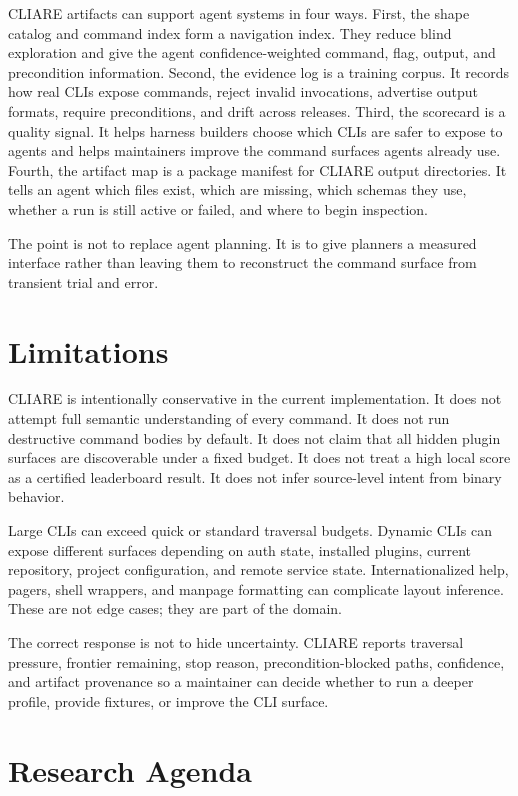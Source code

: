 \documentclass[11pt]{article}
\begin{document}
CLIARE artifacts can support agent systems in four ways. First, the shape catalog and command index form a navigation index. They reduce blind exploration and give the agent confidence-weighted command, flag, output, and precondition information. Second, the evidence log is a training corpus. It records how real CLIs expose commands, reject invalid invocations, advertise output formats, require preconditions, and drift across releases. Third, the scorecard is a quality signal. It helps harness builders choose which CLIs are safer to expose to agents and helps maintainers improve the command surfaces agents already use. Fourth, the artifact map is a package manifest for CLIARE output directories. It tells an agent which files exist, which are missing, which schemas they use, whether a run is still active or failed, and where to begin inspection.

The point is not to replace agent planning. It is to give planners a measured interface rather than leaving them to reconstruct the command surface from transient trial and error.

\section{Limitations}

CLIARE is intentionally conservative in the current implementation. It does not attempt full semantic understanding of every command. It does not run destructive command bodies by default. It does not claim that all hidden plugin surfaces are discoverable under a fixed budget. It does not treat a high local score as a certified leaderboard result. It does not infer source-level intent from binary behavior.

Large CLIs can exceed quick or standard traversal budgets. Dynamic CLIs can expose different surfaces depending on auth state, installed plugins, current repository, project configuration, and remote service state. Internationalized help, pagers, shell wrappers, and manpage formatting can complicate layout inference. These are not edge cases; they are part of the domain.

The correct response is not to hide uncertainty. CLIARE reports traversal pressure, frontier remaining, stop reason, precondition-blocked paths, confidence, and artifact provenance so a maintainer can decide whether to run a deeper profile, provide fixtures, or improve the CLI surface.

\section{Research Agenda}
\end{document}
